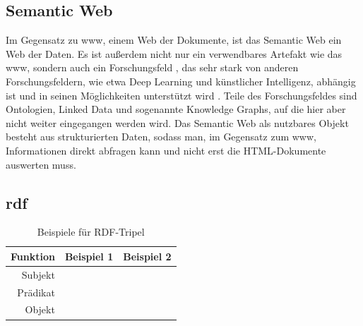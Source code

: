 \subsection{Semantic Web}
Im Gegensatz zu \ac{www}, einem Web der Dokumente, ist das Semantic Web ein Web der Daten.
Es ist außerdem nicht nur ein verwendbares Artefakt wie das \ac{www}, sondern auch ein Forschungsfeld \citep{semanticwebreview},
das sehr stark von anderen Forschungsfeldern, wie etwa Deep Learning und künstlicher Intelligenz,
abhängig ist und in seinen Möglichkeiten unterstützt wird \citep{semanticwebdeeplearning}.
Teile des Forschungsfeldes sind Ontologien, Linked Data und sogenannte Knowledge Graphs, auf die hier aber nicht weiter eingegangen werden wird.
Das Semantic Web als nutzbares Objekt besteht aus strukturierten Daten, sodass man, im Gegensatz zum \ac{www}, Informationen direkt abfragen kann und nicht erst die HTML-Dokumente auswerten muss.

\subsection[RDF]{\acf*{rdf}}
\begin{table}[h]\centering\small
  \begin{tabulary}{\textwidth}{rrl}
    \toprule
    Funktion & Beispiel 1 & Beispiel 2 \\
    \midrule
    Subjekt   &       &             \\
    Prädikat  &  &                       \\
    Objekt    &                &   \\
    \bottomrule
  \end{tabulary}
  \caption{Beispiele für RDF-Tripel}
  \label{tab:rdftripleexample}
\end{table}

